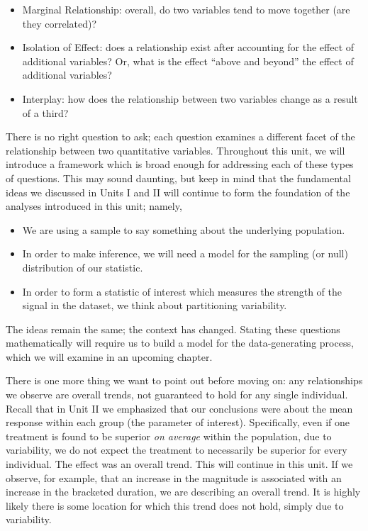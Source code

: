 \documentclass[]{book}
\providecommand{\tightlist}{%
  \setlength{\itemsep}{0pt}\setlength{\parskip}{0pt}}
\theoremstyle{definition}
\theoremstyle{definition}
\theoremstyle{definition}
\theoremstyle{remark}
\begin{document}
\begin{itemize}
\tightlist
\item
  Marginal Relationship: overall, do two variables tend to move together
  (are they correlated)?
\item
  Isolation of Effect: does a relationship exist after accounting for
  the effect of additional variables? Or, what is the effect ``above and
  beyond'' the effect of additional variables?
\item
  Interplay: how does the relationship between two variables change as a
  result of a third?
\end{itemize}

There is no right question to ask; each question examines a different
facet of the relationship between two quantitative variables. Throughout
this unit, we will introduce a framework which is broad enough for
addressing each of these types of questions. This may sound daunting,
but keep in mind that the fundamental ideas we discussed in Units I and
II will continue to form the foundation of the analyses introduced in
this unit; namely,

\begin{itemize}
\tightlist
\item
  We are using a sample to say something about the underlying
  population.
\item
  In order to make inference, we will need a model for the sampling (or
  null) distribution of our statistic.
\item
  In order to form a statistic of interest which measures the strength
  of the signal in the dataset, we think about partitioning variability.
\end{itemize}

The ideas remain the same; the context has changed. Stating these
questions mathematically will require us to build a model for the
data-generating process, which we will examine in an upcoming chapter.

There is one more thing we want to point out before moving on: any
relationships we observe are overall trends, not guaranteed to hold for
any single individual. Recall that in Unit II we emphasized that our
conclusions were about the mean response within each group (the
parameter of interest). Specifically, even if one treatment is found to
be superior \emph{on average} within the population, due to variability,
we do not expect the treatment to necessarily be superior for every
individual. The effect was an overall trend. This will continue in this
unit. If we observe, for example, that an increase in the magnitude is
associated with an increase in the bracketed duration, we are describing
an overall trend. It is highly likely there is some location for which
this trend does not hold, simply due to variability.
\end{document}
